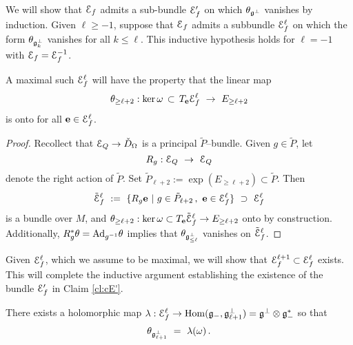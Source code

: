 \documentclass[12pt]{amsart}
\numberwithin{equation}{section}
\numberwithin{table}{section}
\numberwithin{figure}{section}
\begin{document}
We will show that $\mathcal E_f$ admits a sub-bundle $\mathcal E_f'$ on which $\theta_{{\mathfrak{g}}^\perp}$ vanishes by induction.  Given $\ell \ge -1$, suppose that $\mathcal E_f$ admits a subbundle $\mathcal E^\ell_f$ on which the form $\theta_{{\mathfrak{g}}^\perp_k}$ vanishes for all $k \le \ell$.  This inductive hypothesis holds for $\ell = -1$ with $\mathcal E_f = \mathcal E_f^{-1}$.  

\begin{claim} \label{cl:max}
A maximal such $\mathcal E_f^\ell$ will have the property that the linear map
\[
  \theta_{\ge\ell+2} : \mathrm{ker}\,\omega \,\subset\, T_\mathbf{e} \mathcal E_f^\ell 
  \ \to \ E_{\ge\ell+2}
\]
is onto for all $\mathbf{e} \in \mathcal E_f^\ell$.
\end{claim}

\begin{proof}
Recollect that $\mathcal E_Q \to \check D_\Omega$ is a principal $\tilde P$--bundle.  Given $g \in \tilde P$, let 
\[
  R_g : \mathcal E_Q \ \to \ \mathcal E_Q
\]
denote the right action of $\tilde P$.  Set $\tilde P_{\ell+2} := \exp( E_{\ge \ell+2}) \subset \tilde P$.  Then 
\[
  \tilde{\mathcal E}_f^\ell \ := \ \{ R_g \mathbf{e} \ | \ g \in \tilde P_{\ell+2} \,,\
   \mathbf{e} \in \mathcal E_f^\ell \} \ \supset \ \mathcal E_f^\ell
\]
is a bundle over $M$, and $\theta_{\ge\ell+2} : \mathrm{ker}\,\omega \subset T_\mathbf{e} \tilde{\mathcal E}_f^\ell \to E_{\ge\ell+2}$ onto by construction.  Additionally, $R_g^*\theta = \mathrm{Ad}_{g^{-1}}\theta$ implies that $\theta_{{\mathfrak{g}}^\perp_{\le\ell}}$ vanishes on $\tilde {\mathcal E}_f^\ell$.
\end{proof}

\noindent Given $\mathcal E^\ell_f$, which we assume to be maximal, we will show that $\mathcal E^{\ell+1}_f \subset \mathcal E^\ell_f$ exists.  This will complete the inductive argument establishing the existence of the bundle $\mathcal E_f'$ in Claim \ref{cl:cE'}. 

\begin{claim} \label{cl:lambda}
There exists a holomorphic map $\lambda : \mathcal E_f^\ell \to \mathrm{Hom}({\mathfrak{g}}_- , {\mathfrak{g}}^\perp_{\ell + 1})
 = {\mathfrak{g}}^\perp \otimes {\mathfrak{g}}_-^*$ so that 
\begin{equation} \label{E:lam1}
  \theta_{{\mathfrak{g}}^\perp_{\ell+1}} \ = \ \lambda(\omega) \,.
\end{equation}
\end{claim}
\end{document}
